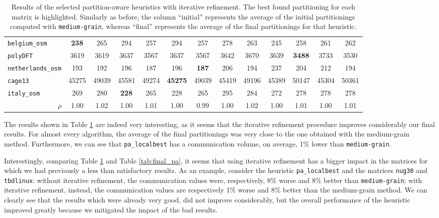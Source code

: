 \begin{table}
\begin{tabular}{|l|c|c||c|c||c|c||c|c||c|c||c|c|}
		\verb|belgium_osm| &  \textbf{238} & 265 & 294 & 257 & 294 & 257 & 278 & 263 & 245 & 258 & 261 & 262 \\
		\verb|polyDFT| &  3619 & 3619 & 3637 & 3567 & 3637 & 3567 & 3642 & 3670 & 3639 & \textbf{3488} & 3733 & 3530 \\
		\verb|netherlands_osm| & 193 & 192 & 196 & 187 & 196 & \textbf{187} & 206 & 194 & 237 & 204 & 212 & 194 \\
		\verb|cage13| &  45275 & 49039 & 45581 & 49274 & \textbf{45275} & 49039 & 45419 & 49196 & 45389 & 50147 & 45304 & 50361 \\
		\verb|italy_osm| &  269 & 280 & \textbf{228} & 265 & 228 & 265 & 295 & 284 & 272 & 278 & 278 & 278 \\ \hline
		\multicolumn{1}{|r|}{$\rho$}	&  1.00 & 1.02 & 1.00 & 1.01 & 1.00 & 0.99 & 1.00 & 1.02 & 1.00 & 1.01 & 1.00 & 1.01 \\  \hline
	\end{tabular}
	\caption{Results of the selected partition-aware heuristics with iterative refinement. The best found partitioning for each matrix is highlighted. Similarly as before, the column ``initial'' represents the average of the initial partitionings computed with \texttt{medium-grain}, whereas ``final'' represents the average of the final partitionings for that heuristic.} \label{tab:pa_ir}
\end{table}
\pagebreak 

The results shown in Table \ref{tab:pa_ir} are indeed very interesting, as it seems that the iterative refinement procedure improves considerably our final results. For almost every algorithm, the average of the final partitionings was very close to the one obtained with the medium-grain method. Furthermore, we can see that \verb|pa_localbest| has a communication volume, on average, 1\% lower than \verb|medium-grain|.

Interestingly, comparing Table \ref{tab:pa_ir} and Table \ref{tab:final_pa}, it seems that using iterative refinement has a bigger impact in the matrices for which we had previously a less than satisfactory results. As an example, consider the heuristic \verb|pa_localbest| and the matrices \verb|nug30| and \verb|tbdlinux|: without iterative refinement, the communication values were, respectively, 8\% worse and 8\% better than \verb|medium-grain|; with iterative refinement, instead, the communication values are respectively 1\% worse and 8\% better than the medium-grain method. We can clearly see that the results which were already very good, did not improve considerably, but the overall performance of the heuristic improved greatly because we mitigated the impact of the bad results.

